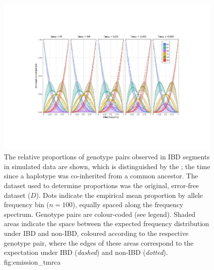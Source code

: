 

\begin{figure}[!htb]
\includegraphics[width=\textwidth]{./img/ch4/emission_tmrca}
{The relative proportions of genotype pairs observed in IBD segments in simulated data are shown, which is distinguished by the ; \ie the time since a haplotype was co-inherited from a common ancestor.
The dataset used to determine proportions was the original, error-free dataset ($D$).
Dots indicate the empirical mean proportion by allele frequency bin (${n=100}$), equally spaced along the frequency spectrum.
Genotype pairs are colour-coded (see legend).
Shaded areas indicate the space between the expected frequency distribution under IBD and non-IBD, coloured according to the respective genotype pair, where the edges of these areas correspond to the expectation under IBD (\emph{dashed}) and non-IBD (\emph{dotted}).}
{fig:emission_tmrca}
\end{figure}
